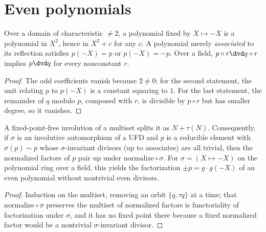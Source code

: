 \section{Even polynomials}

\begin{lemma}
  \label{lem:evenpoly}
  \leanok
  Over a domain of characteristic $\ne 2$, a polynomial fixed by $X \mapsto -X$ is a polynomial
  in $X^2$, hence in $X^2 + c$ for any $c$. A polynomial merely \emph{associated} to its
  reflection satisfies $p(-X) = p$ or $p(-X) = -p$. Over a field, $p \circ r \dvd q \circ r$
  implies $p \dvd q$ for every nonconstant $r$.
\end{lemma}
\begin{proof}
  \leanok
  The odd coefficients vanish because $2 \ne 0$; for the second statement, the unit relating $p$
  to $p(-X)$ is a constant squaring to $1$. For the last statement, the remainder of $q$ modulo
  $p$, composed with $r$, is divisible by $p \circ r$ but has smaller degree, so it vanishes.
\end{proof}

\begin{lemma}
  \label{lem:involution}
  \leanok
  A fixed-point-free involution of a multiset splits it as $N + \tau(N)$. Consequently, if
  $\sigma$ is an involutive automorphism of a UFD and $p$ is a reducible element with
  $\sigma(p) \sim p$ whose $\sigma$-invariant divisors (up to associates) are all trivial, then
  the normalized factors of $p$ pair up under $\mathrm{normalize} \circ \sigma$. For
  $\sigma = (X \mapsto -X)$ on the polynomial ring over a field, this yields the factorization
  $\pm p = g \cdot g(-X)$ of an even polynomial without nontrivial even divisors.
\end{lemma}
\begin{proof}
  \leanok
  Induction on the multiset, removing an orbit $\{q, \tau q\}$ at a time; that
  $\mathrm{normalize} \circ \sigma$ preserves the multiset of normalized factors is
  functoriality of factorization under $\sigma$, and it has no fixed point there because a fixed
  normalized factor would be a nontrivial $\sigma$-invariant divisor.
\end{proof}
